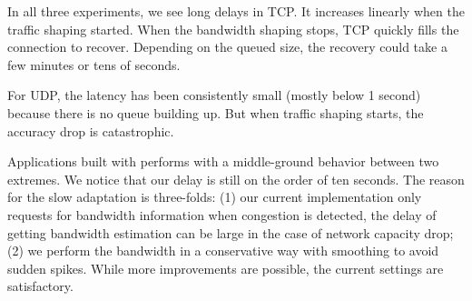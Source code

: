 In all three experiments, we see long delays in TCP. It increases linearly when
the traffic shaping started. When the bandwidth shaping stops, TCP quickly fills
the connection to recover. Depending on the queued size, the recovery could take
a few minutes or tens of seconds.

For UDP, the latency has been consistently small (mostly below 1 second) because
there is no queue building up. But when traffic shaping starts, the accuracy
drop is catastrophic.

Applications built with \sysname{} performs with a middle-ground behavior
between two extremes. We notice that our delay is still on the order of ten
seconds. The reason for the slow adaptation is three-folds: (1) our current
implementation only requests for bandwidth information when congestion is
detected, the delay of getting bandwidth estimation can be large in the case of
network capacity drop; (2) we perform the bandwidth in a conservative way with
smoothing to avoid sudden spikes. While more improvements are possible, the
current settings are satisfactory.

